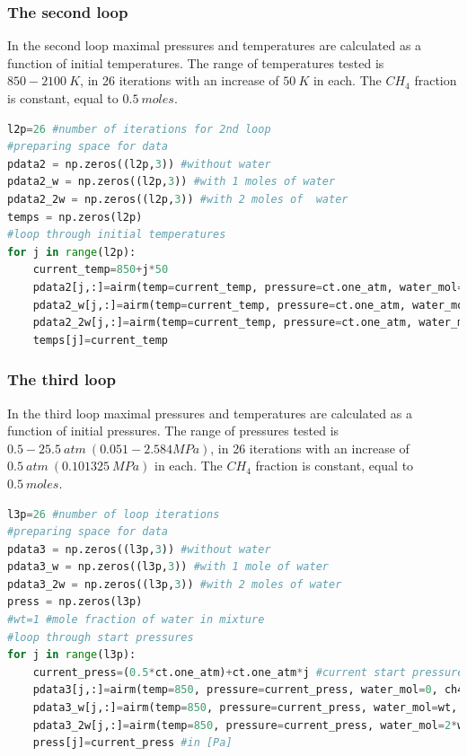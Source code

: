 \documentclass[a4paper]{article}
\begin{document}
\subsubsection{The second loop}
In the second loop maximal pressures and temperatures are calculated as a function of initial temperatures. The range of temperatures tested is $850-2100\ K$, in 26 iterations with an increase of $50\ K$ in each. The $CH_4$ fraction is constant, equal to $0.5\ moles$.
\begin{lstlisting}[language=python]
l2p=26 #number of iterations for 2nd loop
#preparing space for data
pdata2 = np.zeros((l2p,3)) #without water
pdata2_w = np.zeros((l2p,3)) #with 1 moles of water
pdata2_2w = np.zeros((l2p,3)) #with 2 moles of  water
temps = np.zeros(l2p)
#loop through initial temperatures
for j in range(l2p):
    current_temp=850+j*50
    pdata2[j,:]=airm(temp=current_temp, pressure=ct.one_atm, water_mol=0, ch4_mol=5, plot=0)
    pdata2_w[j,:]=airm(temp=current_temp, pressure=ct.one_atm, water_mol=wt, ch4_mol=5, plot=0)
    pdata2_2w[j,:]=airm(temp=current_temp, pressure=ct.one_atm, water_mol=2*wt, ch4_mol=5, plot=0)
    temps[j]=current_temp
\end{lstlisting}

\subsubsection{The third loop}
In the third loop maximal pressures and temperatures are calculated as a function of initial pressures. The range of pressures tested is $0.5-25.5\ atm\ (0.051-2.584 MPa)$, in 26 iterations with an increase of $0.5\ atm\ (0.101325\ MPa)$ in each. The $CH_4$ fraction is constant, equal to $0.5\ moles$.
\begin{lstlisting}[language=python]
l3p=26 #number of loop iterations
#preparing space for data
pdata3 = np.zeros((l3p,3)) #without water
pdata3_w = np.zeros((l3p,3)) #with 1 mole of water
pdata3_2w = np.zeros((l3p,3)) #with 2 moles of water
press = np.zeros(l3p)
#wt=1 #mole fraction of water in mixture
#loop through start pressures
for j in range(l3p):
    current_press=(0.5*ct.one_atm)+ct.one_atm*j #current start pressure in [Pa]
    pdata3[j,:]=airm(temp=850, pressure=current_press, water_mol=0, ch4_mol=5, plot=0)
    pdata3_w[j,:]=airm(temp=850, pressure=current_press, water_mol=wt, ch4_mol=5, plot=0)
    pdata3_2w[j,:]=airm(temp=850, pressure=current_press, water_mol=2*wt, ch4_mol=5, plot=0)
    press[j]=current_press #in [Pa]
\end{lstlisting}
\end{document}
